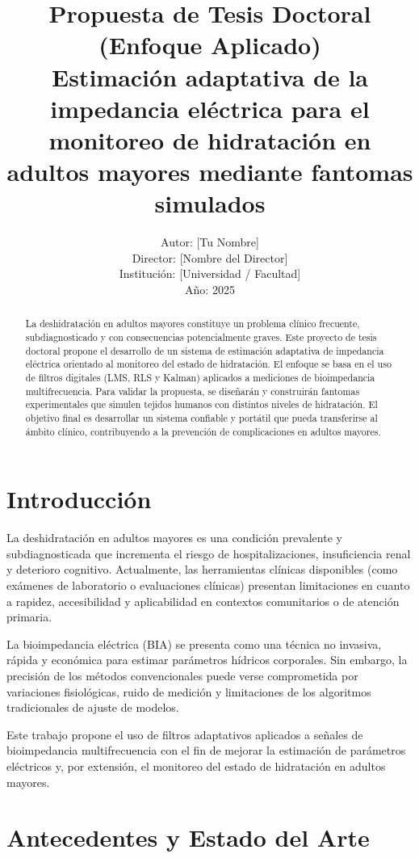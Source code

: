 \documentclass[12pt,a4paper]{article}
\title{\textbf{Propuesta de Tesis Doctoral (Enfoque Aplicado)}\\
Estimación adaptativa de la impedancia eléctrica para el monitoreo de hidratación en adultos mayores mediante fantomas simulados}
\author{Autor: [Tu Nombre] \\
Director: [Nombre del Director] \\
Institución: [Universidad / Facultad] \\
Año: 2025}
\date{}
\begin{document}
\maketitle

\begin{abstract}
La deshidratación en adultos mayores constituye un problema clínico frecuente, subdiagnosticado y con consecuencias potencialmente graves. Este proyecto de tesis doctoral propone el desarrollo de un sistema de estimación adaptativa de impedancia eléctrica orientado al monitoreo del estado de hidratación. El enfoque se basa en el uso de filtros digitales (LMS, RLS y Kalman) aplicados a mediciones de bioimpedancia multifrecuencia. Para validar la propuesta, se diseñarán y construirán fantomas experimentales que simulen tejidos humanos con distintos niveles de hidratación. El objetivo final es desarrollar un sistema confiable y portátil que pueda transferirse al ámbito clínico, contribuyendo a la prevención de complicaciones en adultos mayores.
\end{abstract}

\section{Introducción}
La deshidratación en adultos mayores es una condición prevalente y subdiagnosticada que incrementa el riesgo de hospitalizaciones, insuficiencia renal y deterioro cognitivo. Actualmente, las herramientas clínicas disponibles (como exámenes de laboratorio o evaluaciones clínicas) presentan limitaciones en cuanto a rapidez, accesibilidad y aplicabilidad en contextos comunitarios o de atención primaria.

La bioimpedancia eléctrica (BIA) se presenta como una técnica no invasiva, rápida y económica para estimar parámetros hídricos corporales. Sin embargo, la precisión de los métodos convencionales puede verse comprometida por variaciones fisiológicas, ruido de medición y limitaciones de los algoritmos tradicionales de ajuste de modelos.

Este trabajo propone el uso de filtros adaptativos aplicados a señales de bioimpedancia multifrecuencia con el fin de mejorar la estimación de parámetros eléctricos y, por extensión, el monitoreo del estado de hidratación en adultos mayores.

\section{Antecedentes y Estado del Arte}
\end{document}
